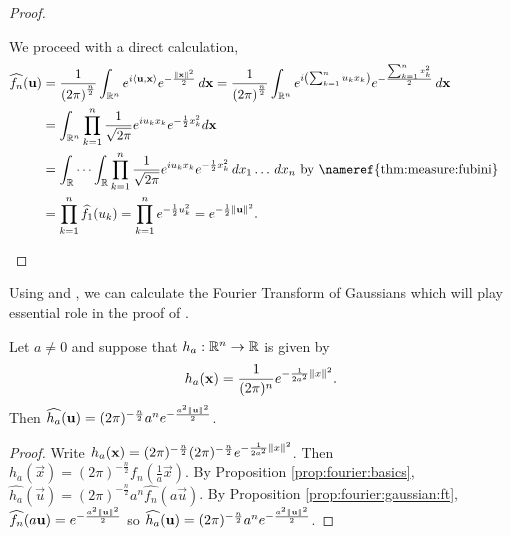 \begin{proof}
\begin{step}
\end{step}
\begin{step} We proceed with a direct calculation,
    \begin{align*}
        \widehat{f_n}(\vec{u}) &= \frac{1}{\left ( 2 \pi \right )^\frac{n}{2}}  \int_{\R^n}  e^{i \langle \vec{u}, \vec{x} \rangle } e^{-\frac{\norm{\vec{x}}^2}{2}} \, d\vec{x}
                             = \frac{1}{\left ( 2 \pi \right )^\frac{n}{2}}  \int_{\R^n}  e^{i \left ( \sum_{k=1}^n u_k x_k \right) } e^{-\frac{ \sum_{k=1}^n  x_k^2 }{2}} \, d\vec{x}  & \\
                             &=  \int_{\R^n}  \prod_{k=1}^n \frac{1}{\sqrt{2 \pi}} e^{i u_k x_k} e^{-\frac{1}{2} x_k^2} d\vec{x} &\\ 
                             &= \int_{\R} \cdots \int_{\R}  \prod_{k=1}^n \frac{1}{\sqrt{2 \pi}} e^{i u_k x_k} e^{-\frac{1}{2} x_k^2} \, d x_1 \ldots  \, d x_n  \text{ by \nameref{thm:measure:fubini}}  \\ 
                             &= \prod_{k=1}^n \widehat{f_1}(u_k) = \prod_{k=1}^n e^{-\frac{1}{2} u_k^2} = e^{-\frac{1}{2} \norm{\vec{u}}^2}. 
    \end{align*}
\end{step}
\end{proof}
\pagebreak
Using  and , we can calculate the Fourier Transform of Gaussians which will play essential role in the proof of .
\begin{corollary}
\label{cor:fourier:gaussian}
Let $a \neq 0$ and suppose that $h_a : {\mathbb R}^n \to {\mathbb R}$ is given by \begin{align*}
    h_a (\mathbf{x}) = \frac{1}{(2 \pi)^n} e^{-\frac{1}{2a^2} \left\lVert x\right\rVert^2}.
\end{align*}
Then $\widehat{h_a} (\mathbf{u}) = (2 \pi)^{-\frac{n}{2}} a^{n} e^{-\frac{a^2 \left\lVert\mathbf{u}\right\rVert^2}{2} }$.
\end{corollary}
\begin{proof}
Write $h_a (\mathbf{x}) = (2 \pi)^{-\frac{n}{2}} (2 \pi)^{-\frac{n}{2}}  e^{-\frac{1}{2a^2} \left\lVert x\right\rVert^2}$. Then $h_a(\vec{x}) =(2 \pi)^{-\frac{n}{2}}  f_n(\frac{1}{a} \vec{x})$.
By Proposition \ref{prop:fourier:basics}, $\widehat{h_a}(\vec{u}) = (2 \pi)^{-\frac{n}{2}}  a^n \widehat{f_n}(a \vec{u})$. By Proposition \ref{prop:fourier:gaussian:ft}, $\widehat{f_n}(a \mathbf{u}) = e^{-\frac{ a^2 \left\lVert\mathbf{u}\right\rVert^2}{2}}$ so $\widehat{h_a} (\mathbf{u}) = (2 \pi)^{-\frac{n}{2}} a^{n} e^{-\frac{a^2 \left\lVert\mathbf{u}\right\rVert^2}{2} }$.
\end{proof}